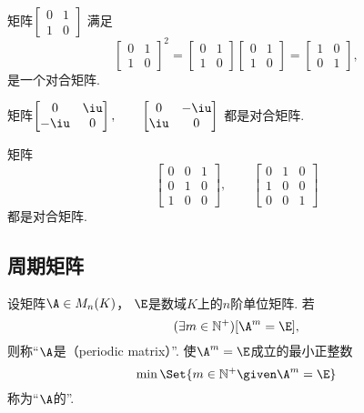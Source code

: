 \begin{example}
矩阵\begin{math}
	\begin{bmatrix}
		0 & 1 \\
		1 & 0
	\end{bmatrix}
\end{math}
满足\[
	\begin{bmatrix}
		0 & 1 \\
		1 & 0
	\end{bmatrix}^2
	=
	\begin{bmatrix}
		0 & 1 \\
		1 & 0
	\end{bmatrix}
	\begin{bmatrix}
		0 & 1 \\
		1 & 0
	\end{bmatrix}
	= \begin{bmatrix}
		1 & 0 \\
		0 & 1
	\end{bmatrix},
\]是一个对合矩阵.
\end{example}
\begin{example}
矩阵\begin{math}
	\begin{bmatrix}
		0 & \iu \\
		-\iu & 0
	\end{bmatrix},
	\qquad
	\begin{bmatrix}
		0 & -\iu \\
		\iu & 0
	\end{bmatrix}
\end{math}
都是对合矩阵.
\end{example}
\begin{example}
矩阵\[
	\begin{bmatrix}
		0 & 0 & 1 \\
		0 & 1 & 0 \\
		1 & 0 & 0
	\end{bmatrix},
	\qquad
	\begin{bmatrix}
		0 & 1 & 0 \\
		1 & 0 & 0 \\
		0 & 0 & 1
	\end{bmatrix}
\]都是对合矩阵.
\end{example}

\subsection{周期矩阵}
\begin{definition}
设矩阵\(\A \in M_n(K)\)，
\(\E\)是数域\(K\)上的\(n\)阶单位矩阵.
若\[
	(\exists m\in\mathbb{N}^+)
	[\A^m = \E],
\]
则称“\(\A\)是（periodic matrix）”.
使\(\A^m = \E\)成立的最小正整数\[
	\min\Set{ m\in\mathbb{N}^+ \given \A^m = \E }
\]称为“\(\A\)的”.
\end{definition}

